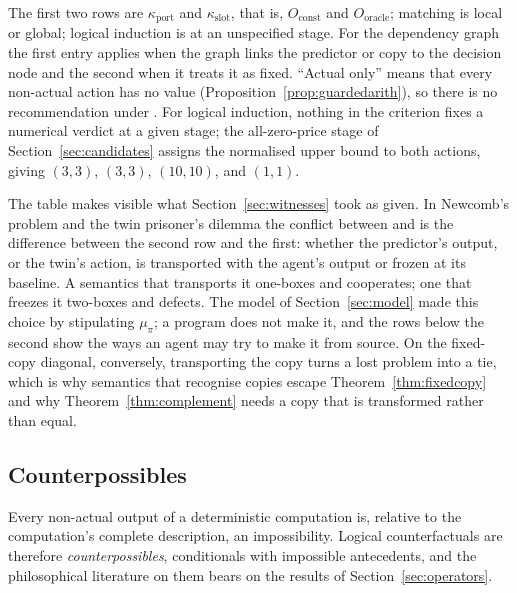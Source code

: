 The first two rows are $\kappa_{\mathrm{port}}$ and $\kappa_{\mathrm{slot}}$, that is, $O_{\mathrm{const}}$
and $O_{\mathrm{oracle}}$; matching is local or global; logical induction is at an unspecified stage.
For the dependency graph the first entry applies when the graph links the predictor or copy to the
decision node and the second when it treats it as fixed. \enquote{Actual only} means that every
non-actual action has no value (Proposition~\ref{prop:guardedarith}), so there is no recommendation
under . For logical induction, nothing in the criterion fixes a numerical verdict at a given
stage; the all-zero-price stage of Section~\ref{sec:candidates} assigns the normalised upper bound to
both actions, giving $(3,3)$, $(3,3)$, $(10,10)$, and $(1,1)$.

The table makes visible what Section~\ref{sec:witnesses} took as given. In Newcomb's problem and the
twin prisoner's dilemma the conflict between  and  is the difference between the second
row and the first: whether the predictor's output, or the twin's action, is transported with the
agent's output or frozen at its baseline. A semantics that transports it one-boxes and cooperates;
one that freezes it two-boxes and defects. The model of Section~\ref{sec:model} made this choice by
stipulating $\mu_\pi$; a program does not make it, and the rows below the second show the ways an agent
may try to make it from source. On the fixed-copy diagonal, conversely, transporting the copy turns a
lost problem into a tie, which is why semantics that recognise copies escape
Theorem~\ref{thm:fixedcopy} and why Theorem~\ref{thm:complement} needs a copy that is transformed rather
than equal.

\subsection{Counterpossibles}\label{sec:cp}

Every non-actual output of a deterministic computation is, relative to the computation's complete
description, an impossibility. Logical counterfactuals are therefore \emph{counterpossibles},
conditionals with impossible antecedents, and the philosophical literature on them bears on the
results of Section~\ref{sec:operators}.

